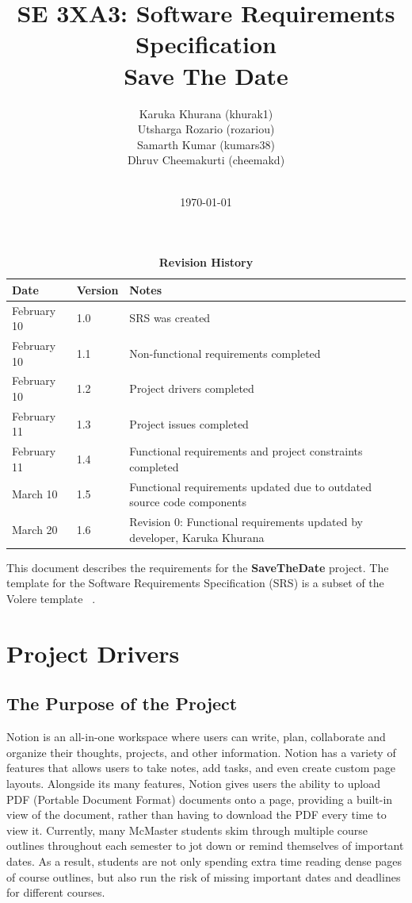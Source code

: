 \documentclass[12pt, titlepage]{article}
\title{SE 3XA3: Software Requirements Specification\\Save The Date}
\author{
        Karuka Khurana (khurak1)\\
        Utsharga Rozario (rozariou)\\
        Samarth Kumar (kumars38)\\
        Dhruv Cheemakurti (cheemakd)\\
        \\
}
\date{\today}
\begin{document}
\maketitle

\tableofcontents
\listoftables
\listoffigures

\newpage

\begin{table}[p]
\caption{\bf Revision History}
\begin{tabularx}{\textwidth}{p{3cm}p{2cm}X}
\toprule {\bf Date} & {\bf Version} & {\bf Notes}\\
\midrule
February 10 & 1.0 & SRS was created\\
February 10 & 1.1 & Non-functional requirements completed\\
February 10 & 1.2 & Project drivers completed\\
February 11 & 1.3 & Project issues completed\\
February 11 & 1.4 & Functional requirements and project constraints completed\\
March 10 & 1.5 & Functional requirements updated due to outdated source code components\\
March 20 & 1.6 & Revision 0: Functional requirements updated by developer, Karuka Khurana\\
\bottomrule
\end{tabularx}
\end{table}

\clearpage


\newpage

This document describes the requirements for the \textbf{SaveTheDate} project. 
The template for the Software Requirements Specification (SRS) is a subset of the Volere
template ~\citep{RobertsonAndRobertson2012}.

\section{Project Drivers}

\subsection{The Purpose of the Project}
Notion is an all-in-one workspace where users can write, plan, collaborate and organize their thoughts, projects, and other information. Notion has a variety of features that allows users to take notes, add tasks, and even create custom page layouts. Alongside its many features, Notion gives users the ability to upload PDF (Portable Document Format) documents onto a page, providing a built-in view of the document, rather than having to download the PDF every time to view it. Currently, many McMaster students skim through multiple course outlines throughout each semester to jot down or remind themselves of important dates. As a result, students are not only spending extra time reading dense pages of course outlines, but also run the risk of missing important dates and deadlines for different courses.  
\end{document}
